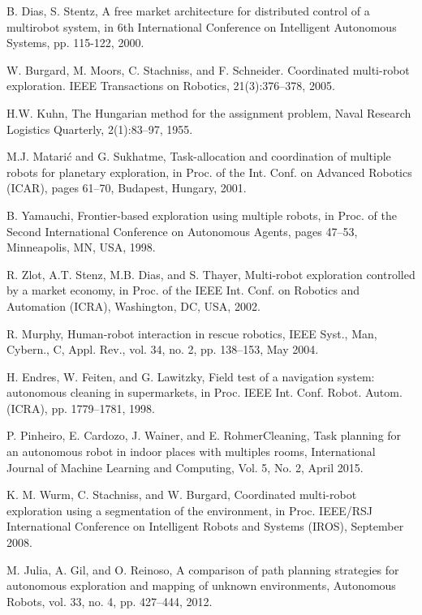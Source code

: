 \documentclass[letterpaper, 10 pt, conference]{ieeeconf}  %
\begin{document}
\begin{thebibliography}{99}

 B. Dias, S. Stentz, A free market architecture for distributed control of a multirobot system, in 6th International Conference on Intelligent Autonomous Systems, pp. 115-122, 2000.

 W. Burgard, M. Moors, C. Stachniss, and F. Schneider. Coordinated multi-robot exploration. IEEE Transactions on Robotics, 21(3):376–378, 2005.

 H.W. Kuhn, The Hungarian method for the assignment problem, Naval Research Logistics Quarterly, 2(1):83–97, 1955.

 M.J. Matarić and G. Sukhatme, Task-allocation and coordination of multiple robots for planetary exploration, in Proc. of the Int. Conf. on Advanced Robotics (ICAR), pages 61–70, Budapest, Hungary, 2001.

 B. Yamauchi, Frontier-based exploration using multiple robots, in Proc. of the Second International Conference on Autonomous Agents, pages 47–53, Minneapolis, MN, USA, 1998.

 R. Zlot, A.T. Stenz, M.B. Dias, and S. Thayer, Multi-robot exploration controlled by a market economy, in Proc. of the IEEE Int. Conf. on Robotics and Automation (ICRA), Washington, DC, USA, 2002.

 R. Murphy, Human-robot interaction in rescue robotics, IEEE Syst., Man, Cybern., C, Appl. Rev., vol. 34, no. 2, pp. 138–153, May 2004.

 H. Endres, W. Feiten, and G. Lawitzky, Field test of a navigation system: autonomous cleaning in supermarkets, in Proc. IEEE Int. Conf. Robot. Autom. (ICRA), pp. 1779–1781, 1998.

 P. Pinheiro, E. Cardozo, J. Wainer, and E. RohmerCleaning, Task planning for an autonomous robot in indoor places with multiples rooms, International Journal of Machine Learning and Computing, Vol. 5, No. 2, April 2015.

 K. M. Wurm, C. Stachniss, and W. Burgard, Coordinated multi-robot exploration using a segmentation of the environment, in Proc. IEEE/RSJ  International Conference on Intelligent Robots and Systems (IROS), September 2008.

 M. Julia, A. Gil, and O. Reinoso, A comparison of path planning strategies for autonomous exploration and mapping of unknown environments, Autonomous Robots, vol. 33, no. 4, pp. 427–444, 2012. 


\end{thebibliography}
\end{document}
